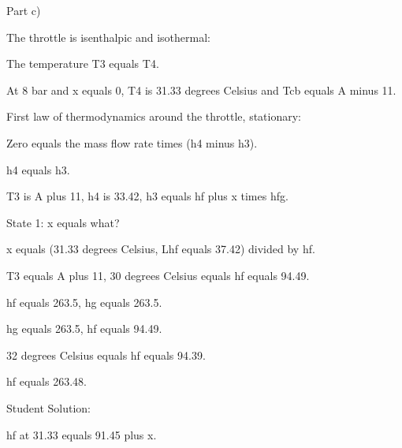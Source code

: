 Part c)

The throttle is isenthalpic and isothermal:

The temperature T3 equals T4.

At 8 bar and x equals 0, T4 is 31.33 degrees Celsius and Tcb equals A minus 11.

First law of thermodynamics around the throttle, stationary:

Zero equals the mass flow rate times (h4 minus h3).

h4 equals h3.

T3 is A plus 11, h4 is 33.42, h3 equals hf plus x times hfg.

State 1: x equals what?

x equals (31.33 degrees Celsius, Lhf equals 37.42) divided by hf.

T3 equals A plus 11, 30 degrees Celsius equals hf equals 94.49.

hf equals 263.5, hg equals 263.5.

hg equals 263.5, hf equals 94.49.

32 degrees Celsius equals hf equals 94.39.

hf equals 263.48.

Student Solution:

hf at 31.33 equals 91.45 plus x.